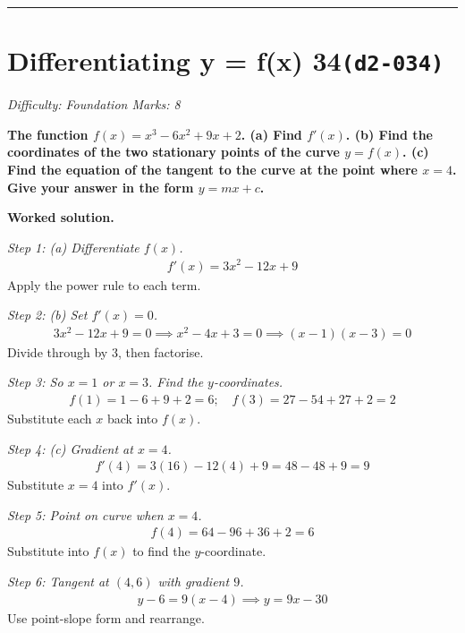 \documentclass[11pt]{article}
\newcommand{\question}[1]{\par\medskip\noindent\textbf{#1}\par}
\begin{document}
\medskip\hrule

\section*{Differentiating y = f(x) 34\quad\small\texttt{(d2-034)}}
\textit{Difficulty: Foundation \quad\textbar\quad Marks: 8}

\question{The function \( f(x) = x^3 - 6x^2 + 9x + 2 \). (a) Find \( f'(x) \). (b) Find the coordinates of the two stationary points of the curve \( y = f(x) \). (c) Find the equation of the tangent to the curve at the point where \( x = 4 \). Give your answer in the form \( y = mx + c \).}

\textbf{Worked solution.}

\textit{Step 1: (a) Differentiate \( f(x) \).}
\[\begin{gathered}
f'(x) = 3x^2 - 12x + 9
\end{gathered}\]
Apply the power rule to each term.

\textit{Step 2: (b) Set \( f'(x) = 0 \).}
\[\begin{gathered}
3x^2 - 12x + 9 = 0 \implies x^2 - 4x + 3 = 0 \implies (x-1)(x-3) = 0
\end{gathered}\]
Divide through by 3, then factorise.

\textit{Step 3: So \( x = 1 \) or \( x = 3 \). Find the \( y \)-coordinates.}
\[\begin{gathered}
f(1) = 1 - 6 + 9 + 2 = 6; \quad f(3) = 27 - 54 + 27 + 2 = 2
\end{gathered}\]
Substitute each \( x \) back into \( f(x) \).

\textit{Step 4: (c) Gradient at \( x = 4 \).}
\[\begin{gathered}
f'(4) = 3(16) - 12(4) + 9 = 48 - 48 + 9 = 9
\end{gathered}\]
Substitute \( x = 4 \) into \( f'(x) \).

\textit{Step 5: Point on curve when \( x = 4 \).}
\[\begin{gathered}
f(4) = 64 - 96 + 36 + 2 = 6
\end{gathered}\]
Substitute into \( f(x) \) to find the \( y \)-coordinate.

\textit{Step 6: Tangent at \( (4, 6) \) with gradient \( 9 \).}
\[\begin{gathered}
y - 6 = 9(x - 4) \implies y = 9x - 30
\end{gathered}\]
Use point-slope form and rearrange.
\end{document}
